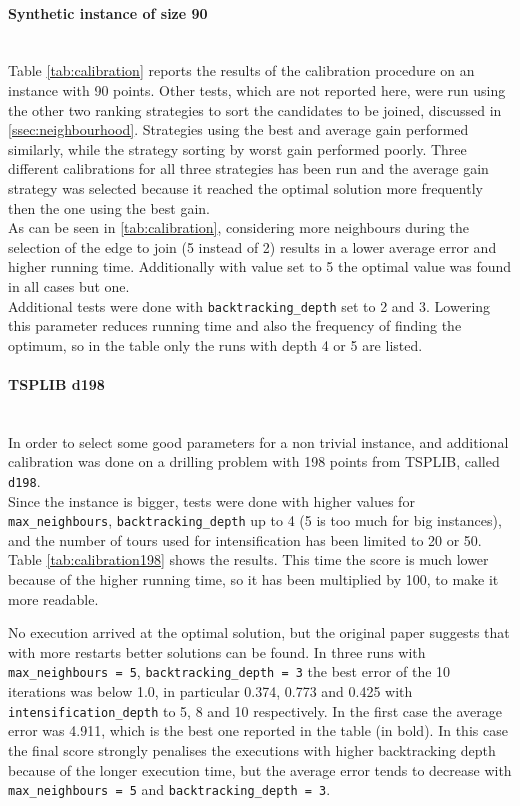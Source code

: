 \paragraph{Synthetic instance of size 90}\mbox{}\\
Table \ref{tab:calibration} reports the results of the calibration procedure on an instance with 90 points.
Other tests, which are not reported here, were run using the other two ranking strategies to sort the candidates to be joined, discussed in \cref{ssec:neighbourhood}. Strategies using the best and average gain performed similarly, while the strategy sorting by worst gain performed poorly. Three different calibrations for all three strategies has been run and the average gain strategy was selected because it reached the optimal solution more frequently then the one using the best gain.\\
As can be seen in \cref{tab:calibration}, considering more neighbours during the selection of the edge to join (5 instead of 2) results in a lower average error and higher running time. Additionally with value set to 5 the optimal value was found in all cases but one.\\
Additional tests were done with \texttt{backtracking\_depth} set to 2 and 3. Lowering this parameter reduces running time and also the frequency of finding the optimum, so in the table only the runs with depth 4 or 5 are listed.\\


\paragraph{TSPLIB d198}\mbox{}\\
In order to select some good parameters for a non trivial instance, and additional calibration was done on a drilling problem with 198 points from TSPLIB, called \texttt{d198}.\\
Since the instance is bigger, tests were done with higher values for \texttt{max\_neighbours}, \texttt{back\-track\-ing\_depth} up to 4 (5 is too much for big instances), and the number of tours used for intensification has been limited to 20 or 50. Table \ref{tab:calibration198} shows the results. This time the score is much lower because of the higher running time, so it has been multiplied by 100, to make it more readable.

\clearpage
{}

No execution arrived at the optimal solution, but the original paper suggests that with more restarts better solutions can be found. In three runs with \texttt{max\_neighbours = 5}, \texttt{back\-track\-ing\_depth = 3} the best error of the 10 iterations was below 1.0, in particular 0.374, 0.773 and 0.425 with \texttt{intensification\_depth} to 5, 8 and 10 respectively. In the first case the average error was 4.911, which is the best one reported in the table (in bold). In this case the final score strongly penalises the executions with higher backtracking depth because of the longer execution time, but the average error tends to decrease with \texttt{max\_neighbours = 5} and \texttt{back\-track\-ing\_depth = 3}.
